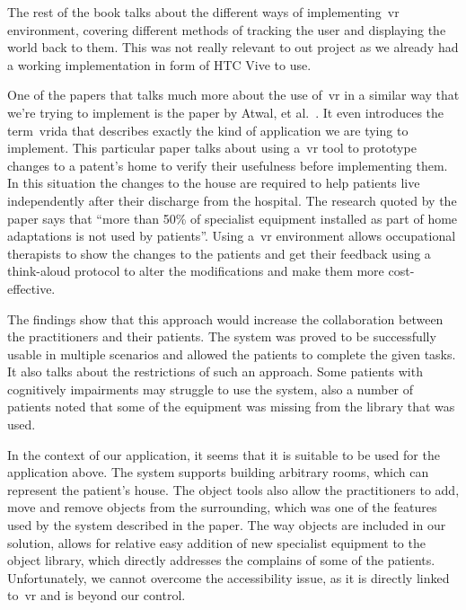 The rest of the book talks about the different ways of implementing~\acrshort{vr} environment, covering different methods of tracking the user and displaying the world back to them. This was not really relevant to out project as we already had a working implementation in form of HTC Vive to use.

%  
One of the papers that talks much more about the use of~\acrshort{vr} in a similar way that we're trying to implement is the paper by Atwal, et al.~\cite{atwal2014}. It even introduces the term~\acrfull{vrida} that describes exactly the kind of application we are tying to implement. This particular paper talks about using a~\acrshort{vr} tool to prototype changes to a patent's home to verify their usefulness before implementing them. In this situation the changes to the house are required to help patients live independently after their discharge from the hospital. The research quoted by the paper says that ``more than 50\% of specialist equipment installed as part of home adaptations is not used by patients''. Using a~\acrshort{vr} environment allows occupational therapists to show the changes to the patients and get their feedback using a think-aloud protocol to alter the modifications and make them more cost-effective.

The findings show that this approach would increase the collaboration between the practitioners and their patients. The system was proved to be successfully usable in multiple scenarios and allowed the patients to complete the given tasks. It also talks about the restrictions of such an approach. Some patients with cognitively impairments may struggle to use the system, also a number of patients noted that some of the equipment was missing from the library that was used.

In the context of our application, it seems that it is suitable to be used for the application above. The system supports building arbitrary rooms, which can represent the patient's house. The object tools also allow the practitioners to add, move and remove objects from the surrounding, which was one of the features used by the system described in the paper. The way objects are included in our solution, allows for relative easy addition of new specialist equipment to the object library, which directly addresses the complains of some of the patients. Unfortunately, we cannot overcome the accessibility issue, as it is directly linked to~\acrshort{vr} and is beyond our control.

